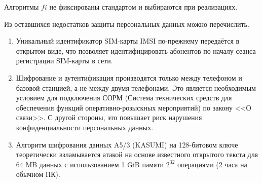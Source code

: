 Алгоритмы $fi$ не фиксированы стандартом и выбираются при реализациях.

Из оставшихся недостатков защиты персональных данных можно перечислить.
\begin{enumerate}
    \item Уникальный идентификатор SIM-карты IMSI по-прежнему передаётся в открытом виде, что позволяет идентифицировать абонентов по началу сеанса регистрации SIM-карты в сети.
    \item Шифрование и аутентификация производятся только между телефоном и базовой станцией, а не между двумя телефонами. Это является необходимым условием для подключения СОРМ (Система технических средств для обеспечения функций оперативно-розыскных мероприятий) по закону <<О связи>>. С другой стороны, это повышает риск нарушения конфиденциальности персональных данных.
    \item Алгоритм шифрования данных A5/3 (KASUMI) на 128-битовом ключе теоретически взламывается атакой на основе известного открытого текста для 64 MB данных с использованием 1 GiB памяти $2^{32}$ операциями (2 часа на обычном ПК).
\end{enumerate}
